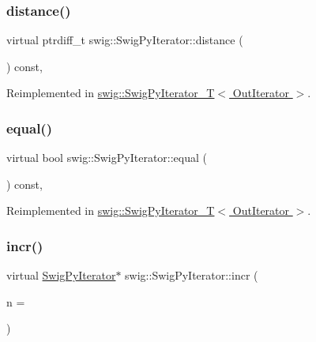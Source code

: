 \subsubsection{\texorpdfstring{distance()}{distance()}}
{\footnotesize\ttfamily virtual ptrdiff\+\_\+t swig\+::\+Swig\+Py\+Iterator\+::distance (\begin{DoxyParamCaption}\item[{const \hyperlink{structswig_1_1_swig_py_iterator}{Swig\+Py\+Iterator} \&}]{ }\end{DoxyParamCaption}) const\hspace{0.3cm}{\ttfamily [inline]}, {\ttfamily [virtual]}}



Reimplemented in \hyperlink{classswig_1_1_swig_py_iterator___t_ab98b853b7da59239d8b260be34dbda26}{swig\+::\+Swig\+Py\+Iterator\+\_\+\+T$<$ Out\+Iterator $>$}.

\mbox{\label{structswig_1_1_swig_py_iterator_ab6fc2cfd1457e734739cf3d4bfe39456}} 
\subsubsection{\texorpdfstring{equal()}{equal()}}
{\footnotesize\ttfamily virtual bool swig\+::\+Swig\+Py\+Iterator\+::equal (\begin{DoxyParamCaption}\item[{const \hyperlink{structswig_1_1_swig_py_iterator}{Swig\+Py\+Iterator} \&}]{ }\end{DoxyParamCaption}) const\hspace{0.3cm}{\ttfamily [inline]}, {\ttfamily [virtual]}}



Reimplemented in \hyperlink{classswig_1_1_swig_py_iterator___t_a14f2ba114f370932df0bf1ab06d0a5e2}{swig\+::\+Swig\+Py\+Iterator\+\_\+\+T$<$ Out\+Iterator $>$}.

\mbox{\label{structswig_1_1_swig_py_iterator_a8881170ecd7d9e674ef37eb16b2c9a7a}} 
\subsubsection{\texorpdfstring{incr()}{incr()}}
{\footnotesize\ttfamily virtual \hyperlink{structswig_1_1_swig_py_iterator}{Swig\+Py\+Iterator}$\ast$ swig\+::\+Swig\+Py\+Iterator\+::incr (\begin{DoxyParamCaption}\item[{size\+\_\+t}]{n = {} }\end{DoxyParamCaption})\hspace{0.3cm}{\ttfamily [pure virtual]}}



